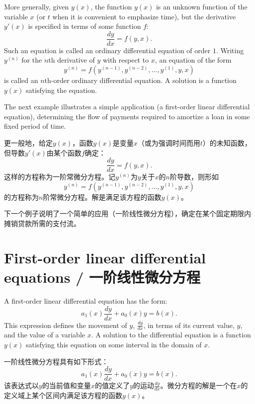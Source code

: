 \begin{original}
More generally, given $y(x)$, the function $y(x)$ is an unknown function of the variable $x$ (or $t$ when it is convenient to emphasize time), but the derivative $y'(x)$ is specified in terms of some function $f$:
\[
\frac{dy}{dx} = f(y, x).
\]
Such an equation is called an ordinary differential equation of order $1$. Writing $y^{(n)}$ for the $n$th derivative of $y$ with respect to $x$, an equation of the form
\[
y^{(n)} = f(y^{(n-1)}, y^{(n-2)}, \ldots, y^{(1)}, y, x)
\]
is called an $n$th-order ordinary differential equation. A solution is a function $y(x)$ satisfying the equation.

The next example illustrates a simple application (a first-order linear differential equation), determining the flow of payments required to amortize a loan in some fixed period of time.
\end{original}
\begin{translation}
更一般地，给定$y(x)$，函数$y(x)$是变量$x$（或为强调时间而用$t$）的未知函数，但导数$y'(x)$由某个函数$f$确定：
\[
\frac{dy}{dx} = f(y, x).
\]
这样的方程称为一阶常微分方程。记$y^{(n)}$为$y$关于$x$的$n$阶导数，则形如
\[
y^{(n)} = f(y^{(n-1)}, y^{(n-2)}, \ldots, y^{(1)}, y, x)
\]
的方程称为$n$阶常微分方程。解是满足该方程的函数$y(x)$。

下一个例子说明了一个简单的应用（一阶线性微分方程），确定在某个固定期限内摊销贷款所需的支付流。
\end{translation}

\section{First-order linear differential equations / 一阶线性微分方程}

\begin{original}
A first-order linear differential equation has the form:
\[
a_1(x)\frac{dy}{dx} + a_0(x)y = b(x).
\]
This expression defines the movement of $y$, $\frac{dy}{dx}$, in terms of its current value, $y$, and the value of a variable $x$. A solution to the differential equation is a function $y(x)$ satisfying this equation on some interval in the domain of $x$.
\end{original}
\begin{translation}
一阶线性微分方程具有如下形式：
\[
a_1(x)\frac{dy}{dx} + a_0(x)y = b(x).
\]
该表达式以$y$的当前值和变量$x$的值定义了$y$的运动$\frac{dy}{dx}$。微分方程的解是一个在$x$的定义域上某个区间内满足该方程的函数$y(x)$。
\end{translation}

